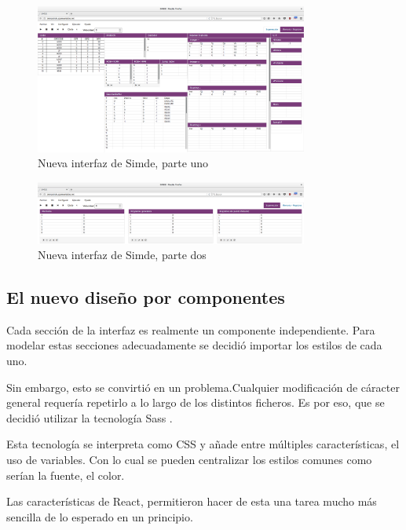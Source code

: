 \begin{figure}[!th]
\begin{center}
\includegraphics[width=0.8\textwidth]{images/cap5/simdenueva1.eps}
\caption{Nueva interfaz de Simde, parte uno}
\label{fig:Nueva interfaz de Simde, parte uno}
\end{center}
\end{figure}

\begin{figure}[!th]
\begin{center}
\includegraphics[width=0.8\textwidth]{images/cap5/simdenueva2.eps}
\caption{Nueva interfaz de Simde, parte dos}
\label{fig:Nueva interfaz de Simde, parte dos}
\end{center}
\end{figure}

\subsection{El nuevo diseño por componentes}

Cada sección de la interfaz es realmente un componente independiente. Para modelar estas secciones 
adecuadamente se decidió importar los estilos de cada uno.

\bigskip
Sin embargo, esto se convirtió en un problema.Cualquier modificación de cáracter general requería
repetirlo a lo largo de los distintos ficheros. Es por eso, que se decidió utilizar la tecnología
Sass \cite{Sass}.

\bigskip
Esta tecnología se interpreta como CSS y añade entre múltiples características, el uso de variables. 
Con lo cual se pueden centralizar los estilos comunes como serían la fuente, el color.

\bigskip
Las características de React, permitieron hacer de esta una tarea mucho más sencilla de lo esperado en 
un principio.